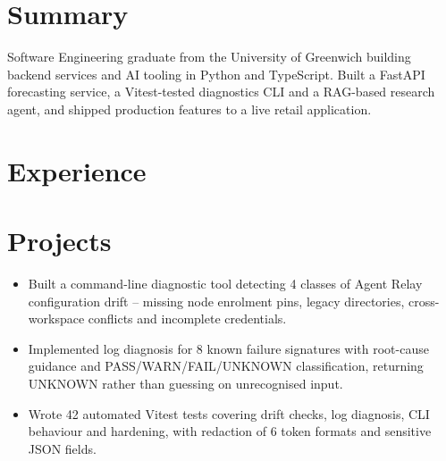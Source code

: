 
\newcommand{\fillin}[1]{\textcolor{red}{\textbf{[#1]}}}

\cvheader

\section{Summary}
Software Engineering graduate from the University of Greenwich building backend services and AI tooling in Python and
TypeScript. Built a FastAPI forecasting service, a Vitest-tested diagnostics CLI and a RAG-based research agent, and
shipped production features to a live retail application.

\section{Experience}


\section{Projects}
\begin{itemize}
  \item Built a command-line diagnostic tool detecting 4 classes of Agent Relay configuration drift -- missing node
        enrolment pins, legacy directories, cross-workspace conflicts and incomplete credentials.
  \item Implemented log diagnosis for 8 known failure signatures with root-cause guidance and PASS/\allowbreak WARN/\allowbreak FAIL/\allowbreak UNKNOWN
        classification, returning UNKNOWN rather than guessing on unrecognised input.
  \item Wrote 42 automated Vitest tests covering drift checks, log diagnosis, CLI behaviour and hardening, with
        redaction of 6 token formats and sensitive JSON fields.
\end{itemize}

